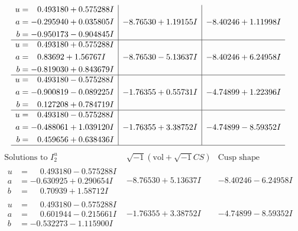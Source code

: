 \documentclass[1p]{elsarticle_modified}
\theoremstyle{definition}
\newcommand{\I}{\sqrt{-1}}
\begin{document}
$$\begin{array}{c|c|c}
\begin{aligned}
u &= \phantom{-}0.493180 + 0.575288 I \\
a &= -0.295940 + 0.035805 I \\
b &= -0.950173 - 0.904845 I\end{aligned}
 & -8.76530 + 1.19155 I & -8.40246 + 1.11998 I \\ \hline\begin{aligned}
u &= \phantom{-}0.493180 + 0.575288 I \\
a &= \phantom{-}0.83692 + 1.56767 I \\
b &= -0.819030 + 0.843679 I\end{aligned}
 & -8.76530 - 5.13637 I & -8.40246 + 6.24958 I \\ \hline\begin{aligned}
u &= \phantom{-}0.493180 - 0.575288 I \\
a &= -0.900819 - 0.089225 I \\
b &= \phantom{-}0.127208 + 0.784719 I\end{aligned}
 & -1.76355 + 0.55731 I & -4.74899 + 1.22396 I \\ \hline\begin{aligned}
u &= \phantom{-}0.493180 - 0.575288 I \\
a &= -0.488061 + 1.039120 I \\
b &= \phantom{-}0.459656 + 0.638436 I\end{aligned}
 & -1.76355 + 3.38752 I & -4.74899 - 8.59352 I\\
 \hline 
 \end{array}$$\newpage$$\begin{array}{c|c|c}  
\text{Solutions to }I^u_{2}& \I (\text{vol} + \sqrt{-1}CS) & \text{Cusp shape}\\
 \hline 
\begin{aligned}
u &= \phantom{-}0.493180 - 0.575288 I \\
a &= -0.630925 + 0.290654 I \\
b &= \phantom{-}0.70939 + 1.58712 I\end{aligned}
 & -8.76530 + 5.13637 I & -8.40246 - 6.24958 I \\ \hline\begin{aligned}
u &= \phantom{-}0.493180 - 0.575288 I \\
a &= \phantom{-}0.601944 - 0.215661 I \\
b &= -0.532273 - 1.115900 I\end{aligned}
 & -1.76355 + 3.38752 I & -4.74899 - 8.59352 I \\ \hline\begin{aligned}

\end{aligned}
\end{array}$$
\end{document}
